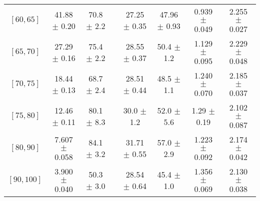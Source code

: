 \begin{tabular}{c||c|c|c|c|c|c|c}
$[60, 65]$ & 41.88 $\pm$ 0.20 & 70.8 $\pm$ 2.2 &  & 27.25 $\pm$ 0.35 & 47.96 $\pm$ 0.93 & 0.939 $\pm$ 0.049 & 2.255 $\pm$ 0.027\\
$[65, 70]$ & 27.29 $\pm$ 0.16 & 75.4 $\pm$ 2.2 &  & 28.55 $\pm$ 0.37 & 50.4 $\pm$ 1.2 & 1.129 $\pm$ 0.095 & 2.229 $\pm$ 0.048\\
$[70, 75]$ & 18.44 $\pm$ 0.13 & 68.7 $\pm$ 2.4 &  & 28.51 $\pm$ 0.44 & 48.5 $\pm$ 1.1 & 1.240 $\pm$ 0.070 & 2.185 $\pm$ 0.037\\
$[75, 80]$ & 12.46 $\pm$ 0.11 & 80.1 $\pm$ 8.3 &  & 30.0 $\pm$ 1.2 & 52.0 $\pm$ 5.6 & 1.29 $\pm$ 0.19 & 2.102 $\pm$ 0.087\\
$[80, 90]$ & 7.607 $\pm$ 0.058 & 84.1 $\pm$ 3.2 &  & 31.71 $\pm$ 0.55 & 57.0 $\pm$ 2.9 & 1.223 $\pm$ 0.092 & 2.174 $\pm$ 0.042\\
$[90, 100]$ & 3.900 $\pm$ 0.040 & 50.3 $\pm$ 3.0 &  & 28.54 $\pm$ 0.64 & 45.4 $\pm$ 1.0 & 1.356 $\pm$ 0.069 & 2.130 $\pm$ 0.038\\
\end{tabular}
